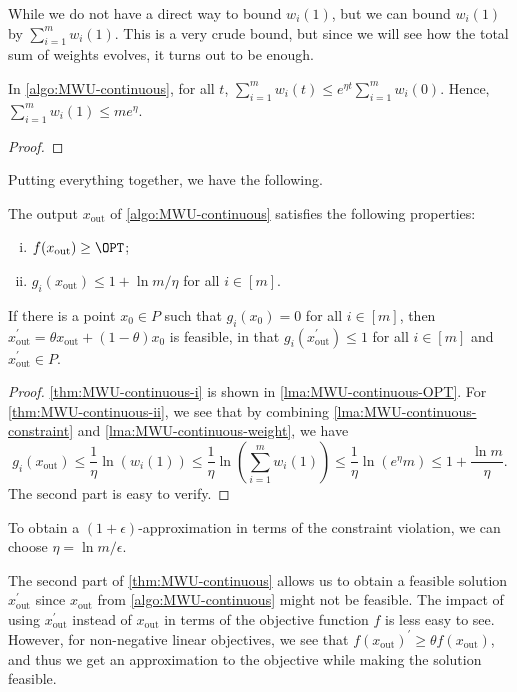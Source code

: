 While we do not have a direct way to bound \(w_i(1)\), but we can bound \(w_i(1)\) by \(\sum_{i=1}^{m} w_i(1)\). This is a very crude bound, but since we will see how the total sum of weights evolves, it turns out to be enough.

\begin{lemma}\label{lma:MWU-continuous-weight}
	In \autoref{algo:MWU-continuous}, for all \(t\), \(\sum_{i=1}^{m} w_i(t) \leq e^{\eta t} \sum_{i=1}^{m} w_i(0)\). Hence, \(\sum_{i=1}^{m} w_i(1) \leq m e^\eta \).
\end{lemma}
\begin{proof}

\end{proof}

Putting everything together, we have the following.

\begin{theorem}\label{thm:MWU-continuous}
	The output \(x_{\text{out} }\) of \autoref{algo:MWU-continuous} satisfies the following properties:
	\begin{enumerate}[(i)]
		\item\label{thm:MWU-continuous-i} \(f(x_{\text{out} }) \geq \OPT\);
		\item\label{thm:MWU-continuous-ii} \(g_i(x_{\text{out} }) \leq 1 + \ln m / \eta \) for all \(i \in [m]\).
	\end{enumerate}
	If there is a point \(x_0 \in P\) such that \(g_i(x_0) = 0\) for all \(i \in [m]\), then \(x_{\text{out} }^{\prime} = \theta x_{\text{out} } + (1 - \theta ) x_0\) is feasible, in that \(g_i(x_{\text{out} }^{\prime} ) \leq 1\) for all \(i \in [m]\) and \(x_{\text{out} }^{\prime} \in P\).
\end{theorem}
\begin{proof}
	\autoref{thm:MWU-continuous-i} is shown in \autoref{lma:MWU-continuous-OPT}. For \autoref{thm:MWU-continuous-ii}, we see that by combining \autoref{lma:MWU-continuous-constraint} and \autoref{lma:MWU-continuous-weight}, we have
	\[
		g_i(x_{\text{out} })
		\leq \frac{1}{\eta } \ln (w_i(1))
		\leq \frac{1}{\eta } \ln (\sum_{i=1}^{m} w_i(1))
		\leq \frac{1}{\eta } \ln (e^\eta m)
		\leq 1 + \frac{\ln m}{\eta }.
	\]
	The second part is easy to verify.
\end{proof}

To obtain a \((1 + \epsilon )\)-approximation in terms of the constraint violation, we can choose \(\eta = \ln m / \epsilon \).

\begin{remark}
	The second part of \autoref{thm:MWU-continuous} allows us to obtain a feasible solution \(x_{\text{out} }^{\prime} \) since \(x_{\text{out} }\) from \autoref{algo:MWU-continuous} might not be feasible. The impact of using \(x_{\text{out} }^{\prime} \) instead of \(x_{\text{out} }\) in terms of the objective function \(f\) is less easy to see. However, for non-negative linear objectives, we see that \(f(x_{\text{out} })^{\prime} \geq \theta f(x_{\text{out} })\), and thus we get an approximation to the objective while making the solution feasible.
\end{remark}

